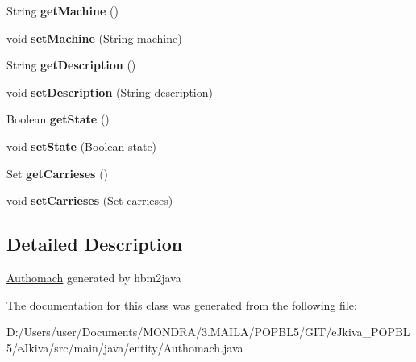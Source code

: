 \begin{DoxyCompactItemize}
String {\bfseries get\+Machine} ()
\item 
\mbox{\label{classentity_1_1_authomach_a76be8150e8122639a36f27cd15a280c5}} 
void {\bfseries set\+Machine} (String machine)
\item 
\mbox{\label{classentity_1_1_authomach_ac935bc6cd52b576e53a3f58c6bb1eb1e}} 
String {\bfseries get\+Description} ()
\item 
\mbox{\label{classentity_1_1_authomach_ab49dd6d37693e9b4a32e881aae5ec898}} 
void {\bfseries set\+Description} (String description)
\item 
\mbox{\label{classentity_1_1_authomach_a6c2b7c4d9aeb91c62791854f9f472b89}} 
Boolean {\bfseries get\+State} ()
\item 
\mbox{\label{classentity_1_1_authomach_a7efa67cff55a9d3678745f918a26d7c8}} 
void {\bfseries set\+State} (Boolean state)
\item 
\mbox{\label{classentity_1_1_authomach_a5d8495c07d12981f8280b5e32a650ff7}} 
Set {\bfseries get\+Carrieses} ()
\item 
\mbox{\label{classentity_1_1_authomach_a7b4310cfe85471695136c12cb29de6cb}} 
void {\bfseries set\+Carrieses} (Set carrieses)
\end{DoxyCompactItemize}


\subsection{Detailed Description}
\mbox{\hyperlink{classentity_1_1_authomach}{Authomach}} generated by hbm2java 

The documentation for this class was generated from the following file\+:\begin{DoxyCompactItemize}
\item 
D\+:/\+Users/user/\+Documents/\+M\+O\+N\+D\+R\+A/3.\+M\+A\+I\+L\+A/\+P\+O\+P\+B\+L5/\+G\+I\+T/e\+Jkiva\+\_\+\+P\+O\+P\+B\+L5/e\+Jkiva/src/main/java/entity/Authomach.\+java\end{DoxyCompactItemize}
